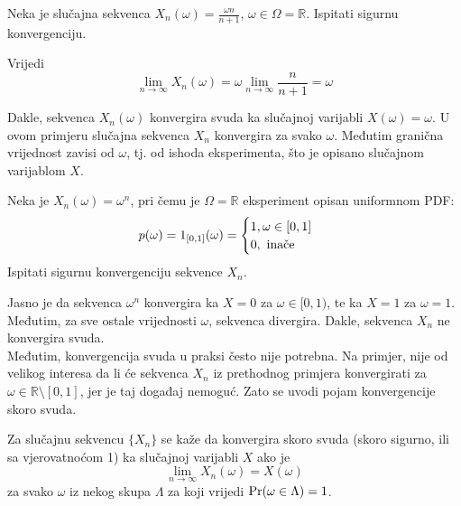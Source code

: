 

\begin{exmp}
  Neka je slučajna sekvenca $X_n(\omega) = \frac{\omega n}{n+1}$, $\omega \in
  \Omega = \mathbb{R}$. Ispitati sigurnu konvergenciju.
\end{exmp}

Vrijedi
\begin{equation}
  \lim_{n\to\infty} X_n(\omega) = \omega \lim_{n\to\infty}\frac{n}{n+1} = \omega
\end{equation}

Dakle, sekvenca $X_n(\omega)$ konvergira svuda ka slučajnoj varijabli $X(\omega)
= \omega$. U ovom primjeru slučajna sekvenca $X_n$ konvergira za svako $\omega$.
Međutim granična vrijednost zavisi od $\omega$, tj. od ishoda eksperimenta, što
je opisano slučajnom varijablom $X$.

\begin{exmp} \label{ex:converge-surely}
  Neka je $X_n(\omega) = \omega^n$, pri čemu je $\Omega= \mathbb{R}$ eksperiment
  opisan uniformnom PDF:
  $$p(\omega) = 1_{[0,1]}(\omega) = \begin{cases}
      1, \omega \in [0,1]\ \\ 0,\ \text{\normalfont inače}
    \end{cases}
  $$
  Ispitati sigurnu konvergenciju sekvence $X_n$.
\end{exmp}

Jasno je da sekvenca $\omega^n$ konvergira ka $X=0$ za $\omega \in [0,1)$, te ka
$X=1$ za $\omega = 1$. Međutim, za sve ostale vrijednosti $\omega$, sekvenca
divergira. Dakle, sekvenca $X_n$ ne konvergira svuda.\\

Međutim, konvergencija svuda u praksi često nije potrebna. Na primjer, nije od
velikog interesa da li će sekvenca $X_n$ iz prethodnog primjera konvergirati za
$\omega \in \mathbb{R}\setminus[0,1]$, jer je taj događaj nemoguć. Zato se uvodi
pojam konvergencije skoro svuda.

\begin{definition}
  Za slučajnu sekvencu $\{X_n\}$ se kaže da konvergira skoro svuda (skoro
  sigurno, ili sa vjerovatnoćom 1) ka slučajnoj varijabli $X$ ako je
  \begin{equation}
    \lim_{n\to\infty} X_n(\omega) = X(\omega)
  \end{equation}
  za svako $\omega$ iz nekog skupa $\Lambda$ za koji vrijedi
  $\mathrm{Pr}(\omega\in\Lambda)=1$.
\end{definition}

